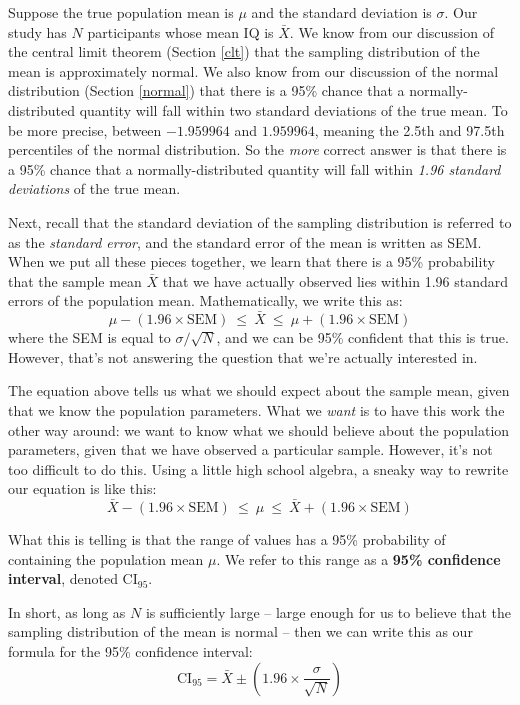 \documentclass[
  11pt,
  a4paper,
  twoside,symmetric,openright]{book}
\theoremstyle{break}
\theoremstyle{break}
\begin{document}
Suppose the true population mean is \(\mu\) and the standard deviation is \(\sigma\). Our study has \(N\) participants whose mean IQ is \(\bar{X}\). We know from our discussion of the central limit theorem (Section \ref{clt}) that the sampling distribution of the mean is approximately normal. We also know from our discussion of the normal distribution (Section \ref{normal}) that there is a 95\% chance that a normally-distributed quantity will fall within two standard deviations of the true mean. To be more precise, between \(-1.959964\) and \(1.959964\), meaning the 2.5th and 97.5th percentiles of the normal distribution. So the \emph{more} correct answer is that there is a 95\% chance that a normally-distributed quantity will fall within \emph{1.96 standard deviations} of the true mean.

Next, recall that the standard deviation of the sampling distribution is referred to as the \emph{standard error}, and the standard error of the mean is written as SEM. When we put all these pieces together, we learn that there is a 95\% probability that the sample mean \(\bar{X}\) that we have actually observed lies within 1.96 standard errors of the population mean. Mathematically, we write this as:
\[
\mu - \left( 1.96 \times \mbox{SEM} \right) \ \leq \ \bar{X}\ \leq \ \mu + \left( 1.96 \times \mbox{SEM} \right) 
\]
where the SEM is equal to \(\sigma / \sqrt{N}\), and we can be 95\% confident that this is true. However, that's not answering the question that we're actually interested in.

The equation above tells us what we should expect about the sample mean, given that we know the population parameters. What we \emph{want} is to have this work the other way around: we want to know what we should believe about the population parameters, given that we have observed a particular sample. However, it's not too difficult to do this. Using a little high school algebra, a sneaky way to rewrite our equation is like this:
\[
\bar{X} - \left( 1.96 \times \mbox{SEM} \right) \ \leq \ \mu \ \leq \ \bar{X} + \left( 1.96 \times \mbox{SEM}\right)
\]

What this is telling is that the range of values has a 95\% probability of containing the population mean \(\mu\). We refer to this range as a \textbf{95\% confidence interval}, denoted \(\mbox{CI}_{95}\).

In short, as long as \(N\) is sufficiently large -- large enough for us to believe that the sampling distribution of the mean is normal -- then we can write this as our formula for the 95\% confidence interval:
\[
\mbox{CI}_{95} = \bar{X} \pm \left( 1.96 \times \frac{\sigma}{\sqrt{N}} \right)
\]
\end{document}
